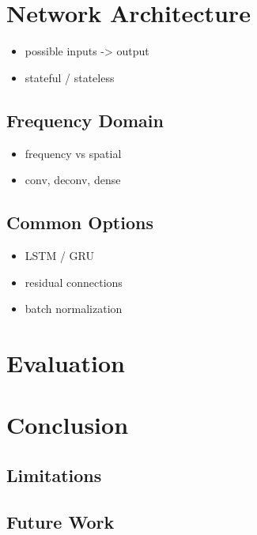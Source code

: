 \documentclass[sigconf]{acmart}
\begin{document}
\section{Network Architecture}
\begin{itemize}
	\item possible inputs -> output
	\item stateful / stateless
\end{itemize}
\subsection{Frequency Domain}
\begin{itemize}
	\item frequency vs spatial
	\item conv, deconv, dense
\end{itemize}
\subsection{Common Options}
\begin{itemize}
	\item LSTM / GRU
	\item residual connections \cite{he2016deep}
	\item batch normalization
\end{itemize}
\section{Evaluation}
\section{Conclusion}
\subsection{Limitations}
\subsection{Future Work}


%

\end{document}
